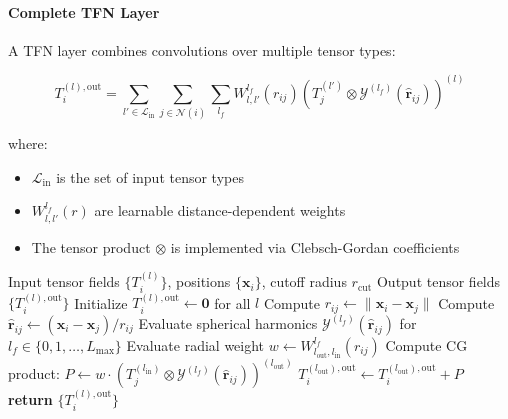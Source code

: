 \paragraph{Complete TFN Layer}

A TFN layer combines convolutions over multiple tensor types:

\begin{equation}\label{eq:tfn_layer}
T_i^{(l), \text{out}} = \sum_{l' \in \mathcal{L}_{\text{in}}} \sum_{j \in \mathcal{N}(i)} \sum_{l_f} W^{l_f}_{l,l'}(r_{ij}) \left(T_j^{(l')} \otimes \mathcal{Y}^{(l_f)}(\hat{\mathbf{r}}_{ij})\right)^{(l)}
\end{equation}

where:
\begin{itemize}
    \item $\mathcal{L}_{\text{in}}$ is the set of input tensor types
    \item $W^{l_f}_{l,l'}(r)$ are learnable distance-dependent weights
    \item The tensor product $\otimes$ is implemented via Clebsch-Gordan coefficients
\end{itemize}

\begin{algorithm}[h]
\caption{Forward Pass of a TFN Layer}
\label{alg:tfn_forward}
\begin{algorithmic}[1]
\Require Input tensor fields $\{T_i^{(l)}\}$, positions $\{\mathbf{x}_i\}$, cutoff radius $r_{\text{cut}}$
\Ensure Output tensor fields $\{T_i^{(l), \text{out}}\}$
    \State Initialize $T_i^{(l), \text{out}} \leftarrow \mathbf{0}$ for all $l$
        \State Compute $r_{ij} \leftarrow \|\mathbf{x}_i - \mathbf{x}_j\|$
        \State Compute $\hat{\mathbf{r}}_{ij} \leftarrow (\mathbf{x}_i - \mathbf{x}_j) / r_{ij}$
        \State Evaluate spherical harmonics $\mathcal{Y}^{(l_f)}(\hat{\mathbf{r}}_{ij})$ for $l_f \in \{0, 1, \ldots, L_{\max}\}$
                    \State Evaluate radial weight $w \leftarrow W^{l_f}_{l_{\text{out}}, l_{\text{in}}}(r_{ij})$
                    \State Compute CG product: $P \leftarrow w \cdot (T_j^{(l_{\text{in}})} \otimes \mathcal{Y}^{(l_f)}(\hat{\mathbf{r}}_{ij}))^{(l_{\text{out}})}$
                    \State $T_i^{(l_{\text{out}}), \text{out}} \leftarrow T_i^{(l_{\text{out}}), \text{out}} + P$
                \EndFor
            \EndFor
        \EndFor
    \EndFor
\EndFor
\State \textbf{return} $\{T_i^{(l), \text{out}}\}$
\end{algorithmic}
\end{algorithm}

